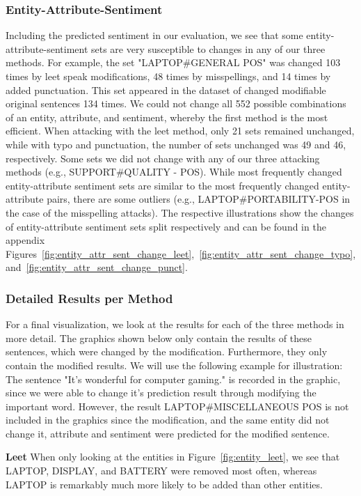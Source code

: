 \subsubsection{Entity-Attribute-Sentiment}
Including the predicted sentiment in our evaluation, we see that some entity-attribute-sentiment sets are very susceptible to changes in any of our three methods. For example, the set "LAPTOP\#GENERAL POS" was changed 103 times by leet speak modifications, 48 times by misspellings, and 14 times by added punctuation. This set appeared in the dataset of changed modifiable original sentences 134 times. We could not change all 552 possible combinations of an entity, attribute, and sentiment, whereby the first method is the most efficient. When attacking with the leet method, only 21 sets remained unchanged, while with typo and punctuation, the number of sets unchanged was 49 and 46, respectively. Some sets we did not change with any of our three attacking methods (e.g., SUPPORT\#QUALITY - POS). While most frequently changed entity-attribute sentiment sets are similar to the most frequently changed entity-attribute pairs, there are some outliers (e.g., LAPTOP\#PORTABILITY-POS in the case of the misspelling attacks). The respective illustrations show the changes of entity-attribute sentiment sets split respectively and can be found in the appendix Figures~\ref{fig:entity_attr_sent_change_leet},~\ref{fig:entity_attr_sent_change_typo}, and~\ref{fig:entity_attr_sent_change_punct}.

\subsubsection{Detailed Results per Method}

For a final visualization, we look at the results for each of the three methods in more detail.
The graphics shown below only contain the results of these sentences, which were changed by the modification. Furthermore, they only contain the modified results. We will use the following example for illustration:
The sentence "It's wonderful for computer gaming." is recorded in the graphic, since we were able to change it's prediction result through modifying the important word. However, the result LAPTOP\#MISCELLANEOUS POS is not included in the graphics since the modification, and the same entity did not change it, attribute and sentiment were predicted for the modified sentence.

\textbf{Leet}
When only looking at the entities in Figure~\ref{fig:entity_leet}, we see that LAPTOP, DISPLAY, and BATTERY were removed most often, whereas LAPTOP is remarkably much more likely to be added than other entities.

